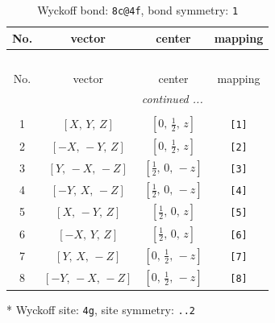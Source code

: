 \documentclass[fleqn,8pt]{jsarticle}
\begin{document}
\renewcommand{\arraystretch}{1.2}
\begin{longtable}{cccc}
\caption{Wyckoff bond: {\tt 8c@4f}, bond symmetry: {\tt 1}}
 \\
 \hline \hline
No. & vector & center & mapping \\ \hline \endfirsthead

\multicolumn{3}{l}{\tablename\ \thetable{}} \\
 \hline \hline
No. & vector & center & mapping \\ \hline \endhead

 \hline \hline
\multicolumn{3}{r}{\footnotesize\it continued ...} \\ \endfoot

 \hline \hline
\multicolumn{3}{r}{} \\ \endlastfoot

1 & $\left[ X,\, Y,\, Z \right]$ & $\left[ 0,\, \frac{1}{2},\, z \right]$ & {\tt [1]} \\ \hline
2 & $\left[ - X,\, - Y,\, Z \right]$ & $\left[ 0,\, \frac{1}{2},\, z \right]$ & {\tt [2]} \\ \hline
3 & $\left[ Y,\, - X,\, - Z \right]$ & $\left[ \frac{1}{2},\, 0,\, - z \right]$ & {\tt [3]} \\ \hline
4 & $\left[ - Y,\, X,\, - Z \right]$ & $\left[ \frac{1}{2},\, 0,\, - z \right]$ & {\tt [4]} \\ \hline
5 & $\left[ X,\, - Y,\, Z \right]$ & $\left[ \frac{1}{2},\, 0,\, z \right]$ & {\tt [5]} \\ \hline
6 & $\left[ - X,\, Y,\, Z \right]$ & $\left[ \frac{1}{2},\, 0,\, z \right]$ & {\tt [6]} \\ \hline
7 & $\left[ Y,\, X,\, - Z \right]$ & $\left[ 0,\, \frac{1}{2},\, - z \right]$ & {\tt [7]} \\ \hline
8 & $\left[ - Y,\, - X,\, - Z \right]$ & $\left[ 0,\, \frac{1}{2},\, - z \right]$ & {\tt [8]} \\
\end{longtable}
* Wyckoff site: {\tt 4g}, site symmetry: {\tt ..2}
\renewcommand{\arraystretch}{1.2}
\end{document}
